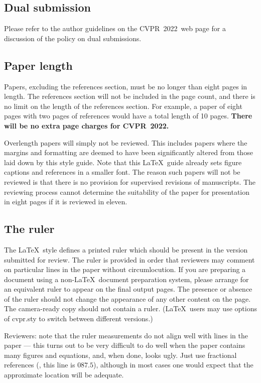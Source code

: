 \documentclass[10pt,twocolumn,letterpaper]{article}
\def\confName{CVPR}
\def\confYear{2022}
\begin{document}
\subsection{Dual submission}

Please refer to the author guidelines on the \confName\ \confYear\ web page for a
discussion of the policy on dual submissions.

\subsection{Paper length}
Papers, excluding the references section, must be no longer than eight pages in length.
The references section will not be included in the page count, and there is no limit on the length of the references section.
For example, a paper of eight pages with two pages of references would have a total length of 10 pages.
{\bf There will be no extra page charges for \confName\ \confYear.}

Overlength papers will simply not be reviewed.
This includes papers where the margins and formatting are deemed to have been significantly altered from those laid down by this style guide.
Note that this \LaTeX\ guide already sets figure captions and references in a smaller font.
The reason such papers will not be reviewed is that there is no provision for supervised revisions of manuscripts.
The reviewing process cannot determine the suitability of the paper for presentation in eight pages if it is reviewed in eleven.

\subsection{The ruler}
The \LaTeX\ style defines a printed ruler which should be present in the version submitted for review.
The ruler is provided in order that reviewers may comment on particular lines in the paper without circumlocution.
If you are preparing a document using a non-\LaTeX\ document preparation system, please arrange for an equivalent ruler to appear on the final output pages.
The presence or absence of the ruler should not change the appearance of any other content on the page.
The camera-ready copy should not contain a ruler.
(\LaTeX\ users may use options of cvpr.sty to switch between different versions.)

Reviewers:
note that the ruler measurements do not align well with lines in the paper --- this turns out to be very difficult to do well when the paper contains many figures and equations, and, when done, looks ugly.
Just use fractional references (\eg, this line is $087.5$), although in most cases one would expect that the approximate location will be adequate.
\end{document}

